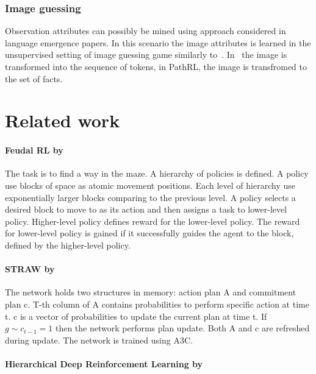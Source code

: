 \documentclass[acmsmall, nonacm]{acmart}
\begin{document}
\subsubsection{Image guessing}

Observation attributes can possibly be mined using approach considered in language emergence papers. In this scenario the image attributes is learned in the unsupervised setting of image guessing game similarly to~\citet{Havrylov2017EmergenceOL}. In~\citet{Havrylov2017EmergenceOL} the image is transformed into the sequence of tokens, in PathRL, the image is transfromed to the set of facts.


\section{Related work}
\label{sec:related_work}

\paragraph{Feudal RL by~\citet{Dayan1992FeudalRL}} %
\label{par:feudal_rl}

The task is to find a way in the maze. A hierarchy of policies is defined. A policy use blocks of space as atomic movement positions. Each level of hierarchy use exponentially larger blocks comparing to the previous level. A policy selects a desired block to move to as its action and then assigns a task to lower-level policy. Higher-level policy defines reward for the lower-level policy. The reward for lower-level policy is gained if it successfully guides the agent to the block, defined by the higher-level policy.


\paragraph{STRAW by~\citet{Vezhnevets2016StrategicAW}} %
\label{par:straw}

The network holds two structures in memory: action plan A and commitment plan c. T-th column of A contains probabilities to perform specific action at time t. c is a vector of probabilities to update the current plan at time t. If $g \sim c_{t-1} = 1$ then the network performs plan update. Both A and c are refreshed during update. The network is trained using A3C.


\paragraph{Hierarchical Deep Reinforcement Learning by~\citet{Kulkarni2016HierarchicalDR}} %
\label{par:hierarchical_deep_rl}
\end{document}
